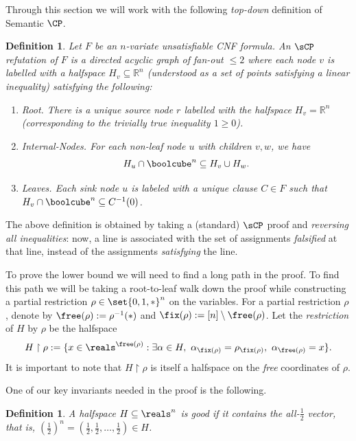 \documentclass[11pt]{article}
\newtheorem{definition}[theorem]{Definition}
\begin{document}
Through this section we will work with the following \emph{top-down} definition of Semantic $\CP$.
\begin{definition}
	Let $F$ be an $n$-variate unsatisfiable CNF formula.
	An $\sCP$ refutation of $F$ is a directed acyclic graph of fan-out $\leq 2$ where each node $v$ is labelled with a halfspace $H_v\subseteq \mathbb{R}^n$ (understood as a set of points satisfying a linear inequality) satisfying the following:
	\begin{enumerate}
		\item \emph{Root.} There is a unique source node $r$ labelled with the halfspace $H_v=\mathbb{R}^n$ (corresponding to the trivially true inequality $1 \geq 0$).
		\item \emph{Internal-Nodes.} For each non-leaf node $u$ with children $v, w$, we have \[H_u \cap \boolcube^n \subseteq H_v \cup H_{w}.\]
		\item \emph{Leaves.} Each sink node $u$ is labeled with a unique clause $C \in F$ such that $H_v \cap \boolcube^n \subseteq C^{-1}(0)$.
	\end{enumerate}
\end{definition}
The above definition is obtained by taking a (standard) $\sCP$ proof and \emph{reversing all inequalities}: now, a line is associated with the set of assignments \emph{falsified} at that line, instead of the assignments \emph{satisfying} the line.

To prove the lower bound we will need to find a long path in the proof.
To find this path we will be taking a root-to-leaf walk down the proof while constructing a partial restriction $\rho \in \set{0,1,*}^n$ on the variables. 
For a partial restriction $\rho$, denote by $\free(\rho) := \rho^{-1}(*)$ and $\fix(\rho):= [n] \setminus \free(\rho)$. 
Let the \emph{restriction} of $H$ by $\rho$ be the halfspace
\[H \restriction \rho := \{ x \in \reals^{\free(\rho)}: \exists \alpha \in H,~ \alpha_{\fix(\rho)} = \rho_{\fix(\rho)},~ \alpha_{\free(\rho)} = x \}. \]
It is important to note that $H \restriction \rho$ is itself a halfspace on the \emph{free} coordinates of $\rho$.

One of our key invariants needed in the proof is the following.
\begin{definition}\label{def:good-halfspace}
	A halfspace $H \subseteq \reals^n$ is \emph{good} if it contains the all-$\frac{1}{2}$ vector, that is, $(\frac{1}{2})^n=(\frac{1}{2},\frac{1}{2},\ldots,\frac{1}{2}) \in H$.
\end{definition}
%
%
\end{document}
